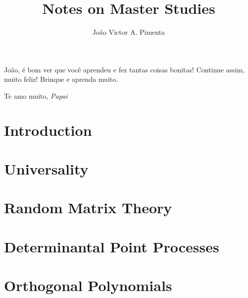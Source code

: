\documentclass[]{report}
\title{Notes on Master Studies}
\author{João Victor A. Pimenta}
\makeatletter
\renewcommand\tableofcontents{%
	\section*{\huge\centering\contentsname
		\@mkboth{%
			\MakeUppercase\contentsname}{\MakeUppercase\contentsname}}%
	\vspace{24pt}%
	\@starttoc{toc}%
	\newpage%
}
\numberwithin{equation}{section} %
\makeatother
\begin{document}
\maketitle
\tableofcontents



\vspace*{\fill}
\epigraph{João, é bom ver que você aprendeu e fez tantas coisas bonitas! Continue assim, muito feliz! Brinque e aprenda muito.}{Te amo muito, \textit{Papai}}

\chapter{Introduction}
\label{Chapter: Intruduction}



\chapter{Universality}
\label{Chapter: Universality}



\chapter{Random Matrix Theory}
\label{Chapter: RMT}



\chapter{Determinantal Point Processes}
\label{Chapter: Determinantal}



\chapter{Orthogonal Polynomials}
\label{Chapter: Orthogonal Polynomials}


\end{document}
